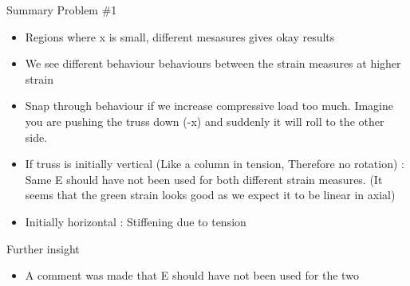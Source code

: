 	\begin{frame}{Summary Problem \#1}
		\begin{itemize}
			\item Regions where x is small, different mesasures gives okay results
			\item We see different behaviour behaviours between the strain measures at higher strain
			\item Snap through behaviour if we increase compressive load too much. Imagine you are pushing the truss down (-x) and suddenly it will roll to the other side. 
			\item If truss  is initially vertical  (Like a column in tension, Therefore no rotation) : Same E should have not been used for both different strain measures. (It seems that the green strain looks good as we expect it to be linear in axial)
			\item Initially horizontal : Stiffening due to tension
			
		\end{itemize}
	\end{frame}

	\begin{frame}{Further insight}
	\begin{itemize}
		\item A comment was made that E should have not been used for the two
	\end{itemize}
	\end{frame}
